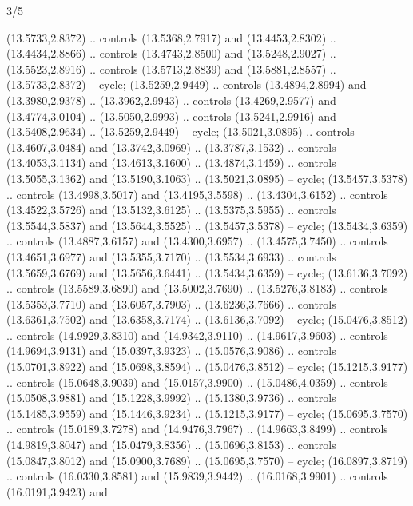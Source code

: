 \begin{flagdescription}{3/5}
{\begin{scope}[fill=red,line width=0.006\lw]
\end{scope}
\begin{scope}[fill=blue,line width=0.001\lw]
 (13.5733,2.8372) .. controls (13.5368,2.7917) and
  (13.4453,2.8302) .. (13.4434,2.8866) .. controls (13.4743,2.8500) and
  (13.5248,2.9027) .. (13.5523,2.8916) .. controls (13.5713,2.8839) and
  (13.5881,2.8557) .. (13.5733,2.8372) -- cycle;
 (13.5259,2.9449) .. controls (13.4894,2.8994) and
  (13.3980,2.9378) .. (13.3962,2.9943) .. controls (13.4269,2.9577) and
  (13.4774,3.0104) .. (13.5050,2.9993) .. controls (13.5241,2.9916) and
  (13.5408,2.9634) .. (13.5259,2.9449) -- cycle;
 (13.5021,3.0895) .. controls (13.4607,3.0484) and
  (13.3742,3.0969) .. (13.3787,3.1532) .. controls (13.4053,3.1134) and
  (13.4613,3.1600) .. (13.4874,3.1459) .. controls (13.5055,3.1362) and
  (13.5190,3.1063) .. (13.5021,3.0895) -- cycle;
 (13.5457,3.5378) .. controls (13.4998,3.5017) and
  (13.4195,3.5598) .. (13.4304,3.6152) .. controls (13.4522,3.5726) and
  (13.5132,3.6125) .. (13.5375,3.5955) .. controls (13.5544,3.5837) and
  (13.5644,3.5525) .. (13.5457,3.5378) -- cycle;
 (13.5434,3.6359) .. controls (13.4887,3.6157) and
  (13.4300,3.6957) .. (13.4575,3.7450) .. controls (13.4651,3.6977) and
  (13.5355,3.7170) .. (13.5534,3.6933) .. controls (13.5659,3.6769) and
  (13.5656,3.6441) .. (13.5434,3.6359) -- cycle;
 (13.6136,3.7092) .. controls (13.5589,3.6890) and
  (13.5002,3.7690) .. (13.5276,3.8183) .. controls (13.5353,3.7710) and
  (13.6057,3.7903) .. (13.6236,3.7666) .. controls (13.6361,3.7502) and
  (13.6358,3.7174) .. (13.6136,3.7092) -- cycle;
 (15.0476,3.8512) .. controls (14.9929,3.8310) and
  (14.9342,3.9110) .. (14.9617,3.9603) .. controls (14.9694,3.9131) and
  (15.0397,3.9323) .. (15.0576,3.9086) .. controls (15.0701,3.8922) and
  (15.0698,3.8594) .. (15.0476,3.8512) -- cycle;
 (15.1215,3.9177) .. controls (15.0648,3.9039) and
  (15.0157,3.9900) .. (15.0486,4.0359) .. controls (15.0508,3.9881) and
  (15.1228,3.9992) .. (15.1380,3.9736) .. controls (15.1485,3.9559) and
  (15.1446,3.9234) .. (15.1215,3.9177) -- cycle;
 (15.0695,3.7570) .. controls (15.0189,3.7278) and
  (14.9476,3.7967) .. (14.9663,3.8499) .. controls (14.9819,3.8047) and
  (15.0479,3.8356) .. (15.0696,3.8153) .. controls (15.0847,3.8012) and
  (15.0900,3.7689) .. (15.0695,3.7570) -- cycle;
 (16.0897,3.8719) .. controls (16.0330,3.8581) and
  (15.9839,3.9442) .. (16.0168,3.9901) .. controls (16.0191,3.9423) and

\end{scope}}
\end{flagdescription}

